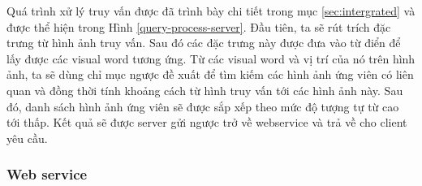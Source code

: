 Quá trình xử lý truy vấn được đã trình bày chi tiết trong mục \ref{sec:intergrated} và được thể hiện trong Hình \ref{query-process-server}. Đầu tiên, ta sẽ rút trích đặc trưng từ hình ảnh truy vấn. Sau đó các đặc trưng này được đưa vào từ điển để lấy được các visual word tương ứng. Từ các visual word và vị trí của nó trên hình ảnh, ta sẽ dùng chỉ mục ngược đề xuất để tìm kiếm các hình ảnh ứng viên có liên quan và đồng thời tính khoảng cách từ hình truy vấn tới các hình ảnh này. Sau đó, danh sách hình ảnh ứng viên sẽ được sắp xếp theo mức độ tượng tự từ cao tới thấp. Kết quả sẽ được server gửi ngược trở về webservice và trả về cho client yêu cầu.

\subsubsection{Web service}
